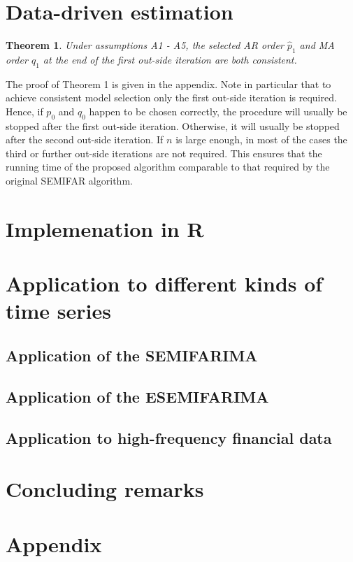 \documentclass[12pt]{article}
\newtheorem{theorem}{Theorem}
\begin{document}
\section{Data-driven estimation}

\begin{theorem}
Under assumptions A1 - A5, the selected AR order $\hat p_1$ and MA order $\hat q_1$ at the end of the first out-side iteration are both consistent.
\end{theorem}
The proof of Theorem 1 is given in the appendix. Note in particular that to achieve consistent model selection only the first out-side iteration is required. Hence, if $p_0$ and $q_0$ happen to be chosen correctly, the procedure will usually be stopped after the first out-side iteration. Otherwise, it will usually be stopped after the second out-side iteration. If $n$ is large enough, in most of the cases the third or further out-side iterations are not required. This ensures that the running time of the proposed algorithm comparable to that required by the original SEMIFAR algorithm.      

\section{Implemenation in R}

\section{Application to different kinds of time series}

\subsection{Application of the SEMIFARIMA}

\subsection{Application of the ESEMIFARIMA}

\subsection{Application to high-frequency financial data}

\section{Concluding remarks}

\section*{Appendix}
\end{document}
